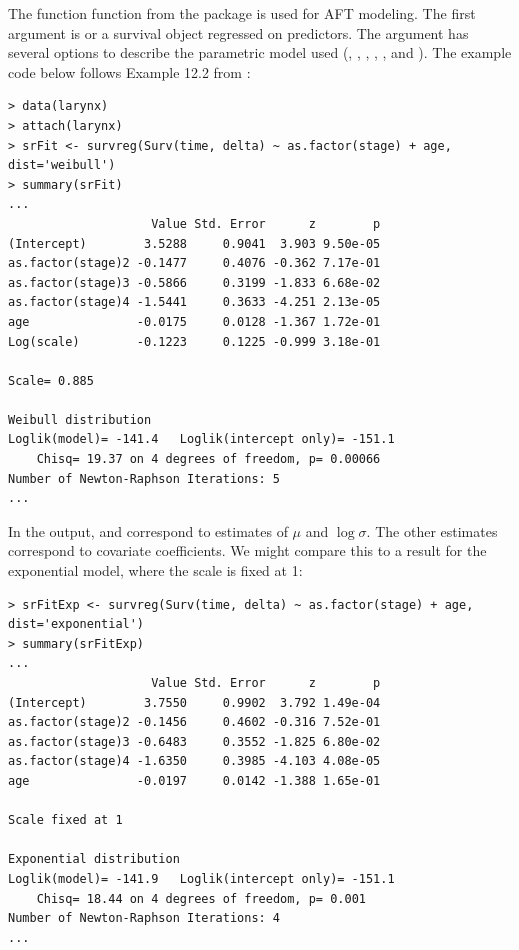 \documentclass[article]{jss}
\begin{document}
The function  function from the  package is used for AFT modeling. The first argument is  or a survival object regressed on predictors. The argument  has several options to describe the parametric model used (, , , , , and ). The example code below follows Example 12.2 from \citet{Klein2003}:
\begin{verbatim}
> data(larynx)
> attach(larynx)
> srFit <- survreg(Surv(time, delta) ~ as.factor(stage) + age, dist='weibull')
> summary(srFit)
...
                    Value Std. Error      z        p
(Intercept)        3.5288     0.9041  3.903 9.50e-05
as.factor(stage)2 -0.1477     0.4076 -0.362 7.17e-01
as.factor(stage)3 -0.5866     0.3199 -1.833 6.68e-02
as.factor(stage)4 -1.5441     0.3633 -4.251 2.13e-05
age               -0.0175     0.0128 -1.367 1.72e-01
Log(scale)        -0.1223     0.1225 -0.999 3.18e-01

Scale= 0.885 

Weibull distribution
Loglik(model)= -141.4   Loglik(intercept only)= -151.1
	Chisq= 19.37 on 4 degrees of freedom, p= 0.00066 
Number of Newton-Raphson Iterations: 5 
...
\end{verbatim}
In the output,  and  correspond to estimates of $\mu$ and $\log\sigma$. The other estimates correspond to covariate coefficients. %
We might compare this to a result for the exponential model, where the scale is fixed at 1:
\begin{verbatim}
> srFitExp <- survreg(Surv(time, delta) ~ as.factor(stage) + age, dist='exponential')
> summary(srFitExp)
...
                    Value Std. Error      z        p
(Intercept)        3.7550     0.9902  3.792 1.49e-04
as.factor(stage)2 -0.1456     0.4602 -0.316 7.52e-01
as.factor(stage)3 -0.6483     0.3552 -1.825 6.80e-02
as.factor(stage)4 -1.6350     0.3985 -4.103 4.08e-05
age               -0.0197     0.0142 -1.388 1.65e-01

Scale fixed at 1 

Exponential distribution
Loglik(model)= -141.9   Loglik(intercept only)= -151.1
	Chisq= 18.44 on 4 degrees of freedom, p= 0.001 
Number of Newton-Raphson Iterations: 4 
...
\end{verbatim}
\end{document}
